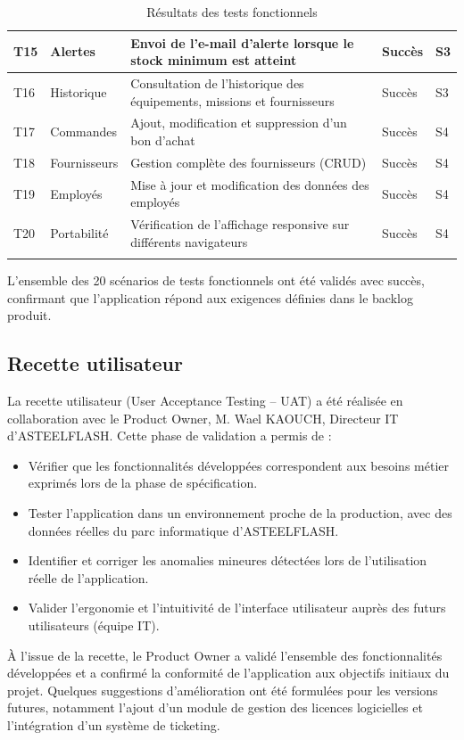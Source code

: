 \begin{longtable}{|m{1cm}|m{3cm}|m{5.5cm}|m{1.5cm}|m{1.5cm}|}
T15 & Alertes & Envoi de l'e-mail d'alerte lorsque le stock minimum est atteint & Succès & S3 \\
\hline
T16 & Historique & Consultation de l'historique des équipements, missions et fournisseurs & Succès & S3 \\
\hline
T17 & Commandes & Ajout, modification et suppression d'un bon d'achat & Succès & S4 \\
\hline
T18 & Fournisseurs & Gestion complète des fournisseurs (CRUD) & Succès & S4 \\
\hline
T19 & Employés & Mise à jour et modification des données des employés & Succès & S4 \\
\hline
T20 & Portabilité & Vérification de l'affichage responsive sur différents navigateurs & Succès & S4 \\
\hline
\captionsetup{justification=centering,margin=1cm}
\caption{Résultats des tests fonctionnels}
\end{longtable}

L'ensemble des 20 scénarios de tests fonctionnels ont été validés avec succès, confirmant que l'application répond aux exigences définies dans le backlog produit.

\subsection{Recette utilisateur}

La recette utilisateur (User Acceptance Testing -- UAT) a été réalisée en collaboration avec le Product Owner, M. Wael KAOUCH, Directeur IT d'ASTEELFLASH. Cette phase de validation a permis de :

\begin{itemize}[label=\textbullet,font=\normalsize]
    \item Vérifier que les fonctionnalités développées correspondent aux besoins métier exprimés lors de la phase de spécification.
    \item Tester l'application dans un environnement proche de la production, avec des données réelles du parc informatique d'ASTEELFLASH.
    \item Identifier et corriger les anomalies mineures détectées lors de l'utilisation réelle de l'application.
    \item Valider l'ergonomie et l'intuitivité de l'interface utilisateur auprès des futurs utilisateurs (équipe IT).
\end{itemize}

À l'issue de la recette, le Product Owner a validé l'ensemble des fonctionnalités développées et a confirmé la conformité de l'application aux objectifs initiaux du projet. Quelques suggestions d'amélioration ont été formulées pour les versions futures, notamment l'ajout d'un module de gestion des licences logicielles et l'intégration d'un système de ticketing.

